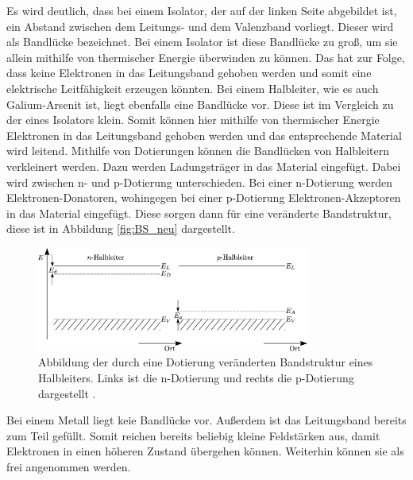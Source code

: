 Es wird deutlich, dass bei einem Isolator, der auf der linken Seite abgebildet ist, ein Abstand zwischen 
dem Leitungs- und dem Valenzband vorliegt. Dieser wird als Bandlücke bezeichnet. Bei einem Isolator ist diese
Bandlücke zu groß, um sie allein mithilfe von thermischer Energie überwinden zu können. Das hat zur Folge, 
dass keine Elektronen in das Leitungsband gehoben werden und somit eine elektrische Leitfähigkeit erzeugen könnten. 
Bei einem Halbleiter, wie es auch Galium-Arsenit ist, liegt ebenfalls eine Bandlücke vor. Diese ist im Vergleich 
zu der eines Isolators klein. Somit können hier mithilfe von thermischer Energie Elektronen in das Leitungsband 
gehoben werden und das entsprechende Material wird leitend. Mithilfe von Dotierungen können die Bandlücken 
von Halbleitern verkleinert werden. Dazu werden Ladungsträger in das Material eingefügt. Dabei wird zwischen 
n- und p-Dotierung unterschieden. Bei einer n-Dotierung werden Elektronen-Donatoren, wohingegen bei einer p-Dotierung
Elektronen-Akzeptoren in das Material eingefügt. Diese sorgen dann für eine veränderte Bandstruktur, diese 
ist in Abbildung \ref{fig:BS_neu} dargestellt. \\
\begin{figure}[H]
    \centering
    \includegraphics[width=0.8\textwidth]{images/BS_neu.png}
    \caption{Abbildung der durch eine Dotierung veränderten Bandstruktur eines Halbleiters. Links ist die n-Dotierung und rechts 
    die p-Dotierung dargestellt \cite{BS_neu}.}
    \label{}
\end{figure} \noindent
Bei einem Metall liegt keie Bandlücke vor. Außerdem ist das Leitungsband bereits zum Teil gefüllt. Somit reichen
bereits beliebig kleine Feldstärken aus, damit Elektronen in einen höheren Zustand übergehen können. Weiterhin 
können sie als frei angenommen werden. 

